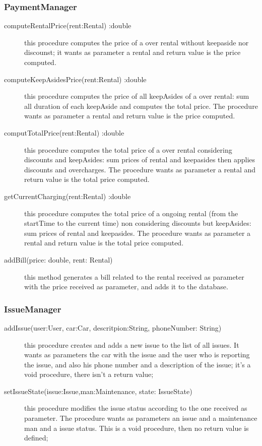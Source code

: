 \documentclass{scrreprt}
\begin{document}
\subsubsection{PaymentManager}
\begin{description}
\item[computeRentalPrice(rent:Rental) :double] this procedure computes the price of a over rental without keepaside nor discounst; it wants as parameter a rental and return value is the price computed. 
\item[computeKeepAsidesPrice(rent:Rental) :double] this procedure computes the price of all keepAsides of a over rental: sum all duration of each keepAside and computes the total price. The procedure wants as parameter a rental and return value is the price computed.
\item[computTotalPrice(rent:Rental) :double] this procedure computes the total price of a over rental considering discounts and keepAsides: sum prices of rental and keepasides then applies discounts and overcharges. The procedure wants as parameter a rental and return value is the total price computed.
\item[getCurrentCharging(rent:Rental) :double] this procedure computes the total price of a ongoing rental (from the startTime to the current time) non considering discounts but keepAsides: sum prices of rental and keepasides. The procedure wants as parameter a rental and return value is the total price computed.
\item[addBill(price: double, rent: Rental)] this method generates a bill related to the rental received as parameter with the price received as parameter, and adds it to the database. 
\end{description}

\subsubsection{IssueManager}
\begin{description}
\item[addIssue(user:User, car:Car, descritpion:String, phoneNumber: String)] this procedure creates and adds a new issue to the list of all issues. It wants as parameters the car with the issue and the user who is reporting the issue, and also his phone number and a description of the issue; it's a void procedure, there isn't a return value;
\item[setIssueState(issue:Issue,man:Maintenance, state: IssueState)] this procedure modifies the issue status according to the one received as parameter. The procedure wants as parameters an issue and a maintenance man and a issue status. This is a void procedure, then no return value is defined;
\end{description}
\end{document}
